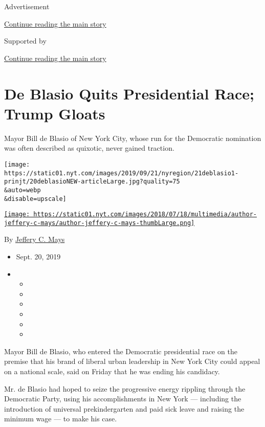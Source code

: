 Advertisement

\protect\hyperlink{after-top}{Continue reading the main story}

Supported by

\protect\hyperlink{after-sponsor}{Continue reading the main story}

\hypertarget{de-blasio-quits-presidential-race-trump-gloats}{%
\section{De Blasio Quits Presidential Race; Trump
Gloats}\label{de-blasio-quits-presidential-race-trump-gloats}}

Mayor Bill de Blasio of New York City, whose run for the Democratic
nomination was often described as quixotic, never gained traction.

\texttt{[image: https://static01.nyt.com/images/2019/09/21/nyregion/21deblasio1-prinjt/20deblasioNEW-articleLarge.jpg?quality=75\\\&auto=webp\\\&disable=upscale]}

\href{https://www.nytimes.com/by/jeffery-c-mays}{\texttt{[image: https://static01.nyt.com/images/2018/07/18/multimedia/author-jeffery-c-mays/author-jeffery-c-mays-thumbLarge.png]}}

By \href{https://www.nytimes.com/by/jeffery-c-mays}{Jeffery C. Mays}

\begin{itemize}
\item
  Sept. 20, 2019
\item
  \begin{itemize}
  \item
  \item
  \item
  \item
  \item
  \item
  \end{itemize}
\end{itemize}

Mayor Bill de Blasio, who entered the Democratic presidential race on
the premise that his brand of liberal urban leadership in New York City
could appeal on a national scale, said on Friday that he was ending his
candidacy.

Mr. de Blasio had hoped to seize the progressive energy rippling through
the Democratic Party, using his accomplishments in New York ---
including the introduction of universal prekindergarten and paid sick
leave and raising the minimum wage --- to make his case.

